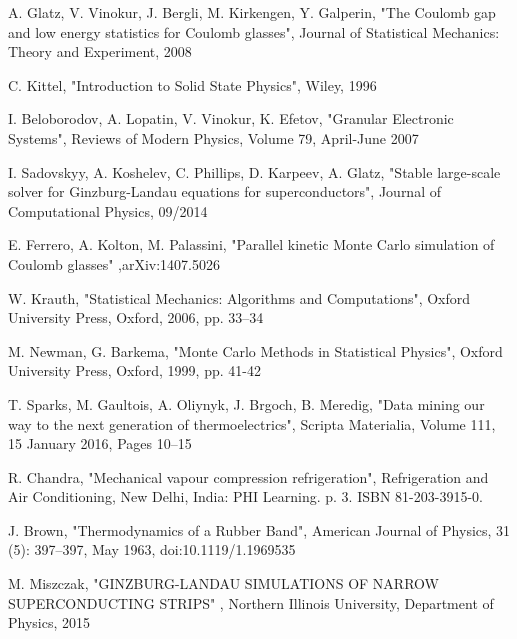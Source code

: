 \begin{thebibliography}{10}
 A. Glatz, V. Vinokur, J. Bergli, M. Kirkengen, Y. Galperin, "The Coulomb gap and low energy statistics for Coulomb glasses", Journal of Statistical Mechanics: Theory and Experiment, 2008

 C. Kittel, "Introduction to Solid State Physics", Wiley, 1996

 I. Beloborodov, A. Lopatin, V. Vinokur, K. Efetov, "Granular Electronic Systems", Reviews of Modern Physics, Volume 79, April-June 2007

 I. Sadovskyy, A. Koshelev, C. Phillips, D. Karpeev, A. Glatz, "Stable large-scale solver for Ginzburg-Landau equations for superconductors", Journal of Computational Physics, 09/2014

 E. Ferrero, A. Kolton, M. Palassini, "Parallel kinetic Monte Carlo simulation of Coulomb glasses" ,arXiv:1407.5026

 W. Krauth, "Statistical Mechanics: Algorithms and Computations", Oxford University Press, Oxford, 2006, pp. 33–34

 M. Newman, G. Barkema, "Monte Carlo Methods in Statistical Physics", Oxford University Press, Oxford, 1999, pp. 41-42

 T. Sparks, M. Gaultois, A. Oliynyk, J. Brgoch, B. Meredig, "Data mining our way to the next generation of thermoelectrics", Scripta Materialia, Volume 111, 15 January 2016, Pages 10–15

 R. Chandra, "Mechanical vapour compression refrigeration", Refrigeration and Air Conditioning, New Delhi, India: PHI Learning. p. 3. ISBN 81-203-3915-0.

 J. Brown, "Thermodynamics of a Rubber Band", American Journal of Physics, 31 (5): 397–397, May 1963, doi:10.1119/1.1969535

 M. Miszczak, "GINZBURG-LANDAU SIMULATIONS OF NARROW SUPERCONDUCTING STRIPS" , Northern Illinois University, Department of Physics, 2015

\end{thebibliography}
